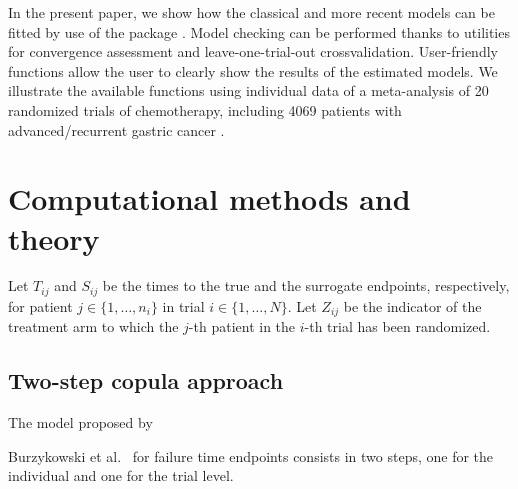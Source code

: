 \documentclass[]{scrartcl}\usepackage[]{graphicx}\usepackage[]{color}
\begin{document}
{In the present paper, we show how the classical and more recent models
  can be fitted by use of the  \citep{R}
  package  \citep{R:surrosurv}.
Model checking can be performed thanks to utilities for convergence assessment
    and leave-one-trial-out crossvalidation.
User-friendly functions allow the user to clearly show the results of the 
    estimated models.
We illustrate the available functions 
  using individual data of a meta-analysis of 20 randomized trials of chemotherapy,
  including 4069 patients with advanced/recurrent gastric cancer
  \citep{GASTRIC13, Paoletti2013}.


\section{Computational methods and theory}
\label{sec:methods}

Let $T_{ij}$ and $S_{ij}$ be the times to the true and the surrogate 
  endpoints, respectively,
  for patient $j\in\{1, \ldots, n_i\}$
  in trial  $i\in\{1, \ldots, N\}$.
Let $Z_{ij}$ be the indicator of the treatment arm
  to which the $j$-th patient in the $i$-th trial has been randomized.


\subsection{Two-step copula approach}
\label{sec:copulaApp}
The model proposed by {Burzykowski et al.~\cite{BurzykowskiEtal01} for failure time endpoints
  consists in two steps, one for the individual and one for the trial level.

}}
\end{document}
